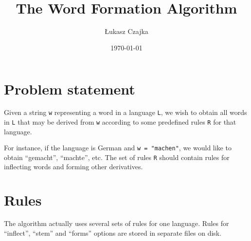 \documentclass[a4paper,12pt]{article}
\begin{document}
\title{The Word Formation Algorithm}
\author{Łukasz Czajka}
\date{\today}
\maketitle

\newpage

\tableofcontents

\newpage

\section{Problem statement}

Given a string \verb#w# representing a word in a language \verb#L#,
we wish to obtain all words in \verb#L# that may be derived from
\verb#w# according to some predefined rules \verb#R# for that language.

For instance, if the language is German and \verb#w = "machen"#, we
would like to obtain ``gemacht'', ``machte'', etc. The set of rules
\verb#R# should contain rules for inflecting words and forming
other derivatives.

\section{Rules}

The algorithm actually uses several sets of rules for one
language. Rules for ``inflect'', ``stem'' and ``forms'' options are
stored in separate files on disk.
\end{document}
